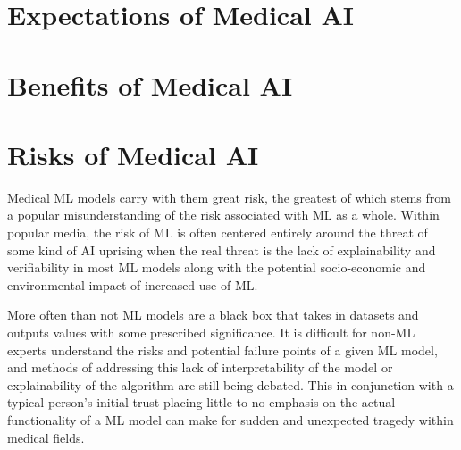\documentclass[]{article}
\begin{document}
	\section{Expectations of Medical AI}

	\section{Benefits of Medical AI}

	\section{Risks of Medical AI}
		Medical ML models carry with them great risk, the greatest of which stems from a popular misunderstanding of the risk associated with ML as a whole. Within popular media, the risk of ML is often centered entirely around the threat of some kind of AI uprising when the real threat is the lack of explainability and verifiability in most ML models along with the potential socio-economic and environmental impact of increased use of ML.\cite{bbc2016rroai,emerj2019roawrtiwwa}

		More often than not ML models are a black box that takes in datasets and outputs values with some prescribed significance. It is difficult for non-ML experts understand the risks and potential failure points of a given ML model, and methods of addressing this lack of interpretability of the model or explainability of the algorithm are still being debated.\cite{10.1145/2858036.2858529, 10.1145/3328519.3329126} This in conjunction with a typical person's initial trust placing little to no emphasis on the actual functionality of a ML model\cite{siau2018building} can make for sudden and unexpected tragedy within medical fields.
\end{document}
